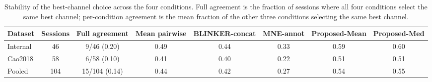 \begin{table}[ht]
  \centering
  \scriptsize
  \setlength{\tabcolsep}{3pt}
  \caption{Stability of the best-channel choice across the four conditions. Full agreement is the fraction of sessions where all four conditions select the same best channel; per-condition agreement is the mean fraction of the other three conditions selecting the same best channel.}
  \label{tab:channel-robustness}
  \begin{tabular}{lccccccc}
    \toprule
    Dataset & Sessions & Full agreement & Mean pairwise & BLINKER-concat & MNE-annot & Proposed-Mean & Proposed-Med \\
    \midrule
    Internal & 46 & 9/46 (0.20) & 0.49 & 0.44 & 0.33 & 0.59 & 0.60 \\
    Cao2018 & 58 & 6/58 (0.10) & 0.41 & 0.40 & 0.22 & 0.51 & 0.51 \\
    Pooled & 104 & 15/104 (0.14) & 0.44 & 0.42 & 0.27 & 0.54 & 0.55 \\
    \bottomrule
  \end{tabular}
\end{table}
